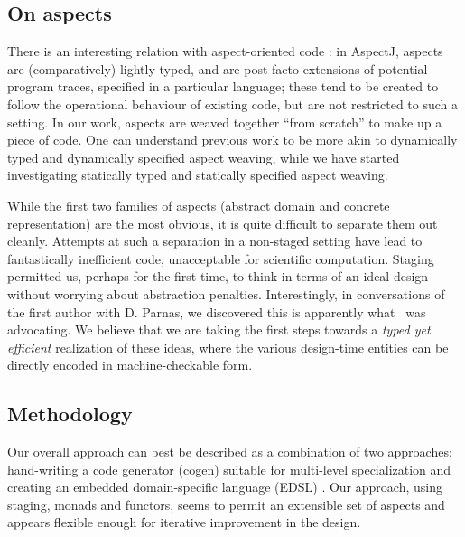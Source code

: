 \documentclass{elsart}
\newcommand{\oleg}[1]{{\it [Oleg says: #1]}}
\newcommand{\jacques}[1]{{\it [Jacques says: #1]}}
\begin{document}
\subsection{On aspects}

There is an interesting relation with aspect-oriented code
\cite{kiczales97aspectoriented}: in AspectJ, 
aspects are (comparatively) lightly typed, and are post-facto extensions of
potential program traces, specified in a particular language; these tend
to be created to follow the operational behaviour of existing code, but
are not restricted to such a setting.
In our work, aspects are weaved together ``from scratch'' to
make up a piece of code.  One can understand previous work to be
more akin to dynamically typed and dynamically specified aspect weaving, while
we have started investigating statically typed and statically specified
aspect weaving.

While the first two families of aspects (abstract domain and concrete
representation) are the most obvious, it is quite difficult to
separate them out cleanly. Attempts at such a separation in a
non-staged setting have lead to fantastically inefficient code,
unacceptable for scientific computation. Staging permitted us, perhaps
for the first time, to think in terms of an ideal design without
worrying about abstraction penalties.  Interestingly, in conversations
of the first author with D. Parnas, we discovered this is
apparently what~\cite{journals/cacm/parnas72a} was advocating.  We
believe that we are taking the first steps towards a \emph{typed yet
efficient} realization of these ideas, where the various design-time
entities can be directly encoded in machine-checkable form.

\subsection{Methodology}

Our overall approach can best be described as a combination 
of two approaches: hand-writing a code generator (cogen) suitable
for multi-level specialization \cite{Gluck95,GluckJ97} and creating
an embedded domain-specific language (EDSL) \cite{edsl,WhenHowDSL}.
Our approach, using staging, monads and functors, seems to permit 
an extensible set of aspects and appears flexible enough for iterative
improvement in the design.

%
\end{document}
